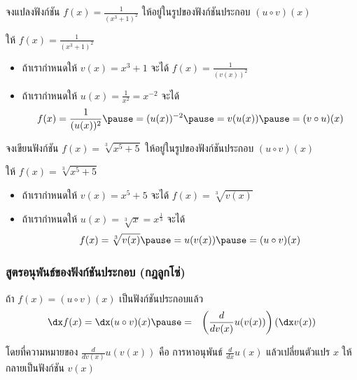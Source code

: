 \begin{frame}[t]
\begin{ex}
จงแปลงฟังก์ชัน $f(x) = \frac{1}{(x^3+1)^2}$ ให้อยู่ในรูปของฟังก์ชันประกอบ $(u \circ v)(x)$
\end{ex}
\begin{sol}
ให้ $f(x) = \frac{1}{(x^3+1)^2}$ \pause 
\begin{itemize}
\item ถ้าเรากำหนดให้ $v(x) = x^3 +1$ \pause จะได้ $f(x) = \frac{1}{(v(x))^2}$ \pause
\item ถ้าเรากำหนดให้ $u(x) = \frac{1}{x^2} = x^{-2}$ \pause จะได้ 
\[ f(x) = \frac{1}{(u(x))^2} \pause = (u(x))^{-2} \pause = v(u(x)) \pause= (v \circ u)(x)\]
\end{itemize}
\end{sol}
\end{frame}


\begin{frame}[t]
\begin{ex}
จงเขียนฟังก์ชัน $f(x) = \sqrt[3]{x^5+5}$ ให้อยู่ในรูปของฟังก์ชันประกอบ $(u \circ v)(x)$
\end{ex}
\begin{sol}
ให้ $f(x) = \sqrt[3]{x^5+5}$ \pause 
\begin{itemize}
\item ถ้าเรากำหนดให้ $v(x) = x^5+5$ \pause จะได้ $f(x) = \sqrt[3]{v(x)}$ \pause
\item ถ้าเรากำหนดให้ $u(x) = \sqrt[3]{x} = x^{\frac{1}{3}}$ \pause จะได้ 
\[ f(x) = \sqrt[3]{v(x)} \pause = u(v(x)) \pause = (u \circ v)(x)\]
\end{itemize}
\end{sol}
\end{frame}

\begin{frame}
\frametitle{สูตรอนุพันธ์ของฟังก์ชันประกอบ (กฎลูกโซ่)}\pause 
\begin{thm}{}{}
ถ้า $f(x) = (u \circ v)(x)$ เป็นฟังก์ชันประกอบแล้ว \pause
\begin{eqnarray}
\dx f(x) = \dx (u \circ v)(x) \pause &=& \left(\frac{d}{d v(x)} u(v(x))\right)\left( \dx v(x)\right)
\end{eqnarray}
\end{thm}
โดยที่ความหมายของ $\frac{d}{d v(x)} u(v(x))$ คือ การหาอนุพันธ์ $\frac{d}{dx} u(x)$ แล้วเปลี่ยนตัวแปร $x$ ให้กลายเป็นฟังก์ชัน $v(x)$
\end{frame}



